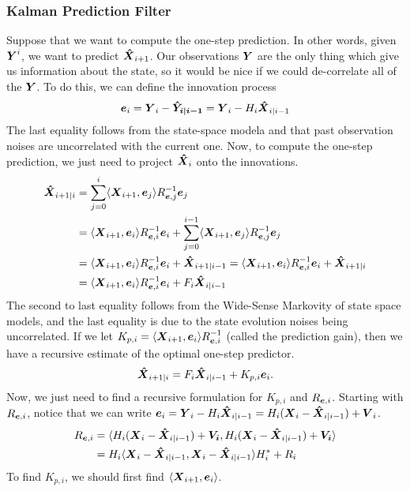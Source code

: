 \subsubsection{Kalman Prediction Filter}
Suppose that we want to compute the one-step prediction.
In other words, given $\boldsymbol{Y}^i$, we want to predict $\boldsymbol{\hat{X}}_{i+1}$.
Our observations $\boldsymbol{Y}$ are the only thing which give us information about the state, so it would be nice if we could de-correlate all of the $\boldsymbol{Y}$.
To do this, we can define the innovation process \[
	\boldsymbol{e}_i = \boldsymbol{Y}_i - \boldsymbol{\hat{Y}_{i|i-1}} = \boldsymbol{Y}_i - H_i\boldsymbol{\hat{X}}_{i|i-1}
\]
The last equality follows from the state-space modela and that past observation noises are uncorrelated with the current one.
Now, to compute the one-step prediction, we just need to project $\boldsymbol{\hat{X}}_i$ onto the innovations.
\begin{align*}
	\boldsymbol{\hat{X}}_{i+1|i} &= \sum_{j=0}^i\langle \boldsymbol{X}_{i+1}, \boldsymbol{e}_j \rangle R_{\boldsymbol{e},j}^{-1}\boldsymbol{e}_j \\
	&= \langle \boldsymbol{X}_{i+1}, \boldsymbol{e}_{i} \rangle R_{\boldsymbol{e},i}^{-1}\boldsymbol{e}_i + \sum_{j=0}^{i-1}\langle \boldsymbol{X}_{i+1}, \boldsymbol{e}_j \rangle R_{\boldsymbol{e},j}^{-1}\boldsymbol{e}_j\\
	&= \langle \boldsymbol{X}_{i+1}, \boldsymbol{e}_{i} \rangle R_{\boldsymbol{e},i}^{-1}\boldsymbol{e}_i + \boldsymbol{\hat{X}}_{i+1|i-1} = \langle \boldsymbol{X}_{i+1}, \boldsymbol{e}_{i} \rangle R_{\boldsymbol{e},i}^{-1}\boldsymbol{e}_i + \boldsymbol{\hat{X}}_{i+1|i}\\
	&= \langle \boldsymbol{X}_{i+1}, \boldsymbol{e}_{i} \rangle R_{\boldsymbol{e},i}^{-1}\boldsymbol{e}_i + F_i\boldsymbol{\hat{X}}_{i|i-1}
\end{align*}
The second to last equality follows from the Wide-Sense Markovity of state space models, and the last equality is due to the state evolution noises being uncorrelated.
If we let $K_{p,i} = \langle \boldsymbol{X}_{i+1}, \boldsymbol{e}_i \rangle R_{\boldsymbol{e},i}^{-1}$ (called the prediction gain), then we have a recursive estimate of the optimal one-step predictor.
\[
	\boldsymbol{\hat{X}}_{i+1|i} = F_i\boldsymbol{\hat{X}}_{i|i-1} + K_{p,i}\boldsymbol{e}_i.
\]
Now, we just need to find a recursive formulation for $K_{p,i}$ and $R_{\boldsymbol{e},i}$.
Starting with $R_{\boldsymbol{e},i}$, notice that we can write $\boldsymbol{e}_i = \boldsymbol{Y}_i-H_i\boldsymbol{\hat{X}}_{i|i-1} = H_i(\boldsymbol{X}_i-\boldsymbol{\hat{X}}_{i|i-1})+\boldsymbol{V}_i$.
\begin{align*}
	R_{\boldsymbol{e},i} &= \langle H_i(\boldsymbol{X}_i - \boldsymbol{\hat{X}}_{i|i-1})+ \boldsymbol{V_i}, H_i(\boldsymbol{X}_i - \boldsymbol{\hat{X}}_{i|i-1})+\boldsymbol{V_i} \rangle\\
	&= H_i\langle \boldsymbol{X}_i - \boldsymbol{\hat{X}}_{i|i-1}, \boldsymbol{X}_i - \boldsymbol{\hat{X}}_{i|i-1} \rangle H_i^* + R_i
\end{align*}
To find $K_{p,i}$, we should first find $\langle \boldsymbol{X}_{i+1}, \boldsymbol{e}_i \rangle$.
